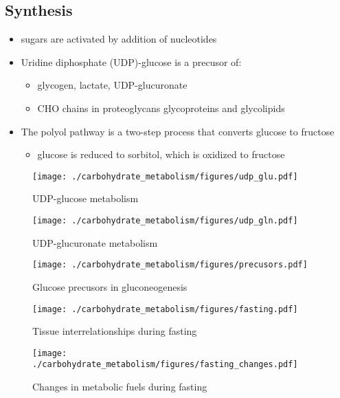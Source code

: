 \documentclass{scrartcl}
\begin{document}
\subsection{Synthesis}
\label{sec:org5fbff18}
\begin{itemize}
\item sugars are activated by addition of nucleotides
\item Uridine diphosphate (UDP)-glucose is a precusor of:
\begin{itemize}
\item glycogen, lactate, UDP-glucuronate
\item CHO chains in proteoglycans glycoproteins and glycolipids
\end{itemize}
\item The polyol pathway is a two-step process that converts glucose to
fructose
\begin{itemize}
\item glucose is reduced to sorbitol, which is oxidized to fructose
\end{itemize}
\end{itemize}

\begin{figure}[htbp]
\centering
\texttt{[image: ./carbohydrate\_metabolism/figures/udp\_glu.pdf]}
\caption{\label{fig:orga49a003}
UDP-glucose metabolism}
\end{figure}

\begin{figure}[htbp]
\centering
\texttt{[image: ./carbohydrate\_metabolism/figures/udp\_gln.pdf]}
\caption{\label{fig:org8dd7d2d}
UDP-glucuronate metabolism}
\end{figure}

\begin{figure}[htbp]
\centering
\texttt{[image: ./carbohydrate\_metabolism/figures/precusors.pdf]}
\caption{\label{fig:org497cc7c}
Glucose precusors in gluconeogenesis}
\end{figure}


\begin{figure}[htbp]
\centering
\texttt{[image: ./carbohydrate\_metabolism/figures/fasting.pdf]}
\caption{\label{fig:org915d120}
Tissue interrelationships during fasting}
\end{figure}


\begin{figure}[htbp]
\centering
\texttt{[image: ./carbohydrate\_metabolism/figures/fasting\_changes.pdf]}
\caption{\label{fig:orgcfe0782}
Changes in metabolic fuels during fasting}
\end{figure}
\end{document}
